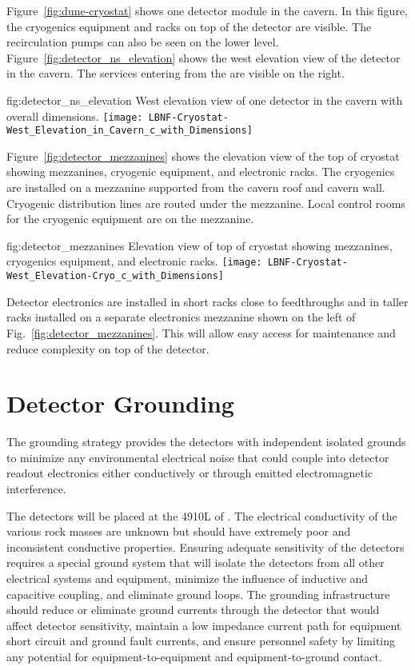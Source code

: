 Figure~\ref{fig:dune-cryostat} shows one detector module in the
cavern. In this figure, the cryogenics equipment and racks on top of
the detector are visible. The  recirculation pumps can also be seen
on the lower level.
Figure~\ref{fig:detector_ns_elevation} shows the west
elevation view of the detector in the cavern. The services entering
from the  are visible on the right.
\begin{dunefigure}{fig:detector_ns_elevation}
  {West elevation view of one detector in the cavern with overall dimensions.}
  \texttt{[image: LBNF-Cryostat-West\_Elevation\_in\_Cavern\_c\_with\_Dimensions]}
\end{dunefigure}
Figure~\ref{fig:detector_mezzanines} shows the elevation view of the
top of cryostat showing mezzanines, cryogenic equipment, and
electronic racks.
The cryogenics are installed on a mezzanine supported from
the cavern roof and cavern wall. Cryogenic distribution lines are
routed under the mezzanine. Local control rooms for the
cryogenic equipment are on the mezzanine.
\begin{dunefigure}{fig:detector_mezzanines}
  {Elevation view of top of cryostat showing mezzanines, cryogenics
    equipment, and electronic racks.}
  \texttt{[image: LBNF-Cryostat-West\_Elevation-Cryo\_c\_with\_Dimensions]}
\end{dunefigure}

Detector electronics are installed in short racks close to
feedthroughs and in taller racks installed on a separate electronics
mezzanine shown on the left of Fig.~\ref{fig:detector_mezzanines}.
This will allow easy access for maintenance and reduce complexity on
top of the detector.

\section{Detector Grounding}
\label{sec:fdsp-coord-faci-grounding}


The grounding strategy provides the detectors with independent
isolated grounds to minimize any environmental electrical noise that
could couple into detector readout electronics either conductively or
through emitted electromagnetic interference.

The detectors will be placed at the 4910L of \surf. The
electrical conductivity of the various rock masses are unknown but
should have extremely poor and inconsistent conductive
properties. Ensuring adequate sensitivity of the detectors requires a
special ground system that will isolate the detectors from all other
electrical systems and equipment, minimize the influence of inductive
and capacitive coupling, and eliminate ground loops. The grounding
infrastructure should reduce or eliminate ground currents through the
detector that would affect detector sensitivity, maintain a low
impedance current path for equipment short circuit and ground fault
currents, and ensure personnel safety by limiting any potential for
equipment-to-equipment and equipment-to-ground contact.

